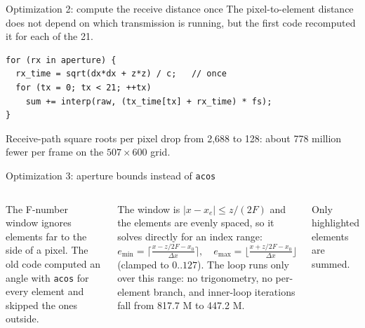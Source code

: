 \documentclass[aspectratio=169,10pt]{beamer}
\begin{document}
\begin{frame}[fragile]{Optimization 2: compute the receive distance once}
  The pixel-to-element distance does not depend on which transmission is running, but the first code recomputed it for each of the 21.
  \begin{lstlisting}
for (rx in aperture) {
  rx_time = sqrt(dx*dx + z*z) / c;   // once
  for (tx = 0; tx < 21; ++tx)
    sum += interp(raw, (tx_time[tx] + rx_time) * fs);
}
  \end{lstlisting}
  \small Receive-path square roots per pixel drop from 2,688 to 128: about 778 million fewer per frame on the $507\times600$ grid.
\end{frame}

\begin{frame}{Optimization 3: aperture bounds instead of \texttt{acos}}
  \begin{columns}[T,onlytextwidth]
    \small
    The F-number window ignores elements far to the side of a pixel. The old code computed an angle with \texttt{acos} for every element and skipped the ones outside.

    \smallskip
    The window is $|x-x_e|\le z/(2F)$ and the elements are evenly spaced, so it solves directly for an index range:
    \[
      e_{\min}=\Big\lceil\tfrac{x-z/2F-x_0}{\Delta x}\Big\rceil,\quad
      e_{\max}=\Big\lfloor\tfrac{x+z/2F-x_0}{\Delta x}\Big\rfloor
    \]
    (clamped to $0..127$). The loop runs only over this range: no trigonometry, no per-element branch, and inner-loop iterations fall from 817.7 M to 447.2 M.
    \centering

    {\scriptsize Only highlighted elements are summed.}
  \end{columns}
\end{frame}
\end{document}
